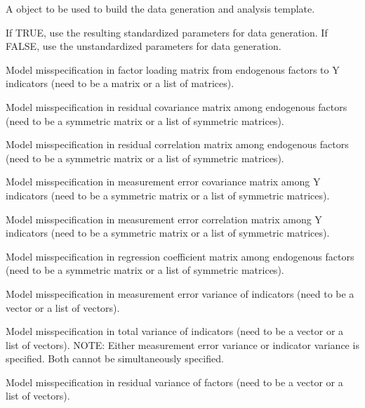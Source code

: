 \documentclass[a4paper]{book}
\begin{document}
\begin{Arguments}
\begin{ldescription}
\item[\code{object}] 
A  object to be used to build the data generation and analysis template.

\item[\code{std}] 
If TRUE, use the resulting standardized parameters for data generation. If FALSE, use the unstandardized parameters for data generation.

\item[\code{LY}] 
Model misspecification in factor loading matrix from endogenous factors to Y indicators (need to be a matrix or a list of matrices).

\item[\code{PS}] 
Model misspecification in residual covariance matrix among endogenous factors (need to be a symmetric matrix or a list of symmetric matrices).

\item[\code{RPS}] 
Model misspecification in residual correlation matrix among endogenous factors (need to be a symmetric matrix or a list of symmetric matrices).

\item[\code{TE}] 
Model misspecification in measurement error covariance matrix among Y indicators (need to be a symmetric matrix or a list of symmetric matrices).

\item[\code{RTE}] 
Model misspecification in measurement error correlation matrix among Y indicators (need to be a symmetric matrix or a list of symmetric matrices).

\item[\code{BE}] 
Model misspecification in regression coefficient matrix among endogenous factors (need to be a symmetric matrix or a list of symmetric matrices).

\item[\code{VTE}] 
Model misspecification in measurement error variance of indicators (need to be a vector or a list of vectors).

\item[\code{VY}] 
Model misspecification in total variance of indicators (need to be a vector or a list of vectors). NOTE: Either measurement error variance or indicator variance is specified. Both cannot be simultaneously specified.

\item[\code{VPS}] 
Model misspecification in residual variance of factors (need to be a vector or a list of vectors).


\end{ldescription}
\end{Arguments}
\end{document}
